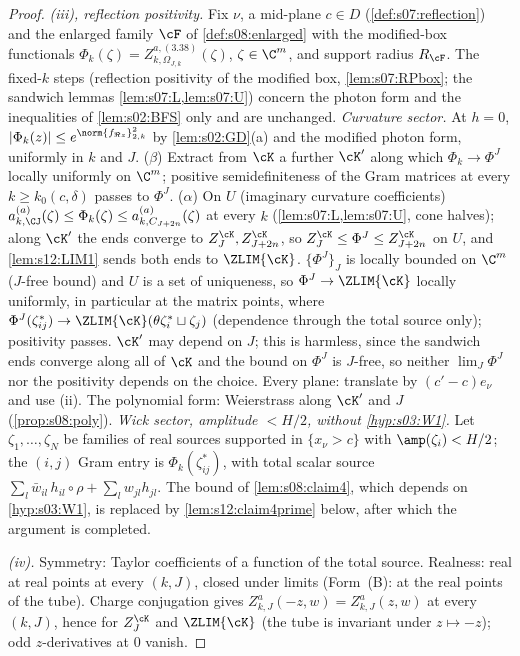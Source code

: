 \begin{proof}
\emph{(iii), reflection positivity.} Fix $\nu$, a mid-plane $c\in D$ (\cref{def:s07:reflection}) and the enlarged family $\cF$ of \cref{def:s08:enlarged} with the modified-box functionals $\Phi_k(\zeta)=Z^{a,(3.38)}_{k,\Omega_{J,k}}(\zeta)$, $\zeta\in\C^m$, and support radius $R_\cF$. The fixed-$k$ steps (reflection positivity of the modified box, \cref{lem:s07:RPbox}; the sandwich lemmas \cref{lem:s07:L,lem:s07:U}) concern the photon form and the inequalities of \cref{lem:s02:BFS} only and are unchanged. \emph{Curvature sector.} At $h=0$, $|\Phi_k(z)|\le e^{\norm{f_{\Re z}}^2_{2,k}}$ by \cref{lem:s02:GD}(a) and the modified photon form, uniformly in $k$ and $J$. ($\beta$) Extract from $\cK$ a further $\cK'$ along which $\Phi_k\to\Phi^J$ locally uniformly on $\C^m$; positive semidefiniteness of the Gram matrices at every $k\ge k_0(c,\delta)$ passes to $\Phi^J$. ($\alpha$) On $U$ (imaginary curvature coefficients) $a^{(a)}_{k,\CJ}(\zeta)\le\Phi_k(\zeta)\le a^{(a)}_{k,C_{J+2n}}(\zeta)$ at every $k$ (\cref{lem:s07:L,lem:s07:U}, cone halves); along $\cK'$ the ends converge to $Z^{\cK}_J,Z^{\cK}_{J+2n}$, so $Z^{\cK}_J\le\Phi^J\le Z^{\cK}_{J+2n}$ on $U$, and \cref{lem:s12:LIM1} sends both ends to $\ZLIM{\cK}$. $\{\Phi^J\}_J$ is locally bounded on $\C^m$ ($J$-free bound) and $U$ is a set of uniqueness, so $\Phi^J\to\ZLIM{\cK}$ locally uniformly, in particular at the matrix points, where $\Phi^J(\zeta^*_{ij})\to\ZLIM{\cK}(\theta\zeta^*_i\sqcup\zeta_j)$ (dependence through the total source only); positivity passes. $\cK'$ may depend on $J$; this is harmless, since the sandwich ends converge along all of $\cK$ and the bound on $\Phi^J$ is $J$-free, so neither $\lim_J\Phi^J$ nor the positivity depends on the choice. Every plane: translate by $(c'-c)e_\nu$ and use (ii). The polynomial form: Weierstrass along $\cK'$ and $J$ (\cref{prop:s08:poly}). \emph{Wick sector, amplitude $<H/2$, without \cref{hyp:s03:W1}.} Let $\zeta_1,\dots,\zeta_N$ be families of real sources supported in $\{x_\nu>c\}$ with $\amp(\zeta_i)<H/2$; the $(i,j)$ Gram entry is $\Phi_k(\zeta^*_{ij})$, with total scalar source $\sum_l\bar w_{il}\,h_{il}\circ\rho+\sum_lw_{jl}h_{jl}$. The bound of \cref{lem:s08:claim4}, which depends on \cref{hyp:s03:W1}, is replaced by \cref{lem:s12:claim4prime} below, after which the argument is completed.

\emph{(iv).} Symmetry: Taylor coefficients of a function of the total source. Realness: real at real points at every $(k,J)$, closed under limits (Form~(B): at the real points of the tube). Charge conjugation gives $Z^a_{k,J}(-z,w)=Z^a_{k,J}(z,w)$ at every $(k,J)$, hence for $Z^{\cK}_J$ and $\ZLIM{\cK}$ (the tube is invariant under $z\mapsto-z$); odd $z$-derivatives at $0$ vanish.


\end{proof}

